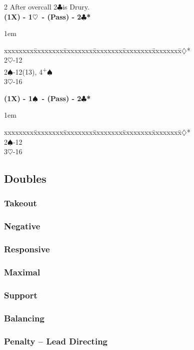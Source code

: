 \documentclass[10pt]{article}
\renewcommand{\c}{$\clubsuit$}
\renewcommand{\d}{$\diamondsuit$}
\newcommand{\h}{$\heartsuit$}
\newcommand{\s}{$\spadesuit$}
\newcommand{\p}{\textsuperscript{+}}
\newcommand{\m}{\textsuperscript{\textminus}}
\newenvironment{bidtable}[1][]
{\textbf{#1}
  \begin{adjustwidth}{1em}{}
    \addvspace{2pt}
    \begin{tabbing}
      xxxxxxxx\=xxxxxxxx\=xxxxxxxx\=xxxxxxxx\=xxxxxxxx\=xxxxxxxx\=\kill}
{\end{tabbing}\end{adjustwidth}\bigskip}%
\begin{document}
\begin{multicols*}{2}
After overcall 2\c is Drury.\\

\begin{bidtable}[(1X) - 1\h\ - (Pass) - 2\c*]
2\d*       {}\m                           \\
2\h        {}-12                         \\
2\s        {}-12(13), 4\p\s               \\
3\h        {}-16
\end{bidtable}

\begin{bidtable}[(1X) - 1\s\ - (Pass) - 2\c*]
2\d* {}\m   \\
2\s  {}-12 \\
3\h  {}-16
\end{bidtable}

\subsection{Doubles}

\subsubsection{Takeout}

\subsubsection{Negative}

\subsubsection{Responsive}

\subsubsection{Maximal}

\subsubsection{Support}

\subsubsection{Balancing}

\subsubsection{Penalty -- Lead Directing}


\end{multicols*}
\end{document}
